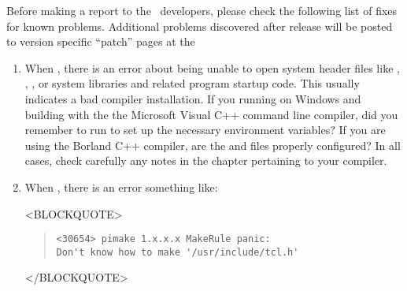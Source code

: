 Before making a report to the \OOMMF\ developers, please check the
following list of fixes for known problems.  Additional problems
discovered after release will be posted to version specific ``patch''
pages at the
\begin{enumerate}
\item When
,
there is an error about being unable to open system header files like
, , , or system libraries and related
program startup code.  This usually indicates a bad compiler
installation.  If you running on Windows and building with the the
Microsoft Visual C++ command line compiler, did you remember to run
 to set up the necessary environment variables?  If
you are using the Borland C++ compiler, are the  and
 files properly configured?  In all cases, check
carefully any notes in the chapter
 pertaining to your compiler.

\item When
,
there is an error something like:
\begin{rawhtml}
<BLOCKQUOTE>
\end{rawhtml}
\begin{quote}
\begin{verbatim}
<30654> pimake 1.x.x.x MakeRule panic:
Don't know how to make '/usr/include/tcl.h'
\end{verbatim}
\end{quote}
\begin{rawhtml}
</BLOCKQUOTE>
\end{rawhtml}


\end{enumerate}
